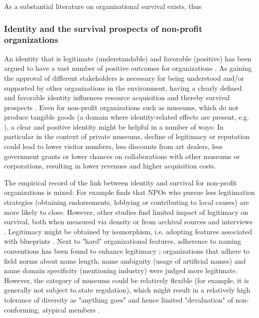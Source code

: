 \documentclass[12pt]{article}
\begin{document}
As a substantial literature on organizational survival exists, thus


\subsubsection*{Identity and the survival prospects of non-profit organizations}

An identity that is legitimate (understandable) and favorable (positive) has been argued to have a vast number of positive outcomes for organizations \parencite{Lange_Lee_Dai_2010_reputation}.
As gaining the approval of different stakeholders is necessary for being understood and/or supported by other organizations in the environment, having a clearly defined and favorable identity influences resource acquisition and thereby survival prospects \parencite{Rao_1994_reputation}.
Even for non-profit organizations such as museums, which do not produce tangible goods (a domain where identity-related effects are present, e.g. \cite{Hsu_2015_granted,Bogaert_etal_2014_ecological}), a clear and positive identity might be helpful in a number of ways:
In particular in the context of private museums, decline of legitimacy or reputation could lead to lower visitor numbers, less discounts from art dealers, less government grants or lower chances on collaborations with other museums or corporations, resulting in lower revenues and higher acquisition costs.


The empirical record of the link between identity and survival for non-profit organizations is mixed: 
For example \textcite{Bielefeld_1994_survival} finds that NPOs who pursue less legitimation strategies (obtaining endorsements, lobbying or contributing to local causes) are more likely to close.
However, other studies find limited impact of legitimacy on survival, both when measured via density \parencite{Bogaert_etal_2014_ecological} or from archival sources and interviews \parencite{Fernandez_2007_dissolution}.
Legitimacy might be obtained by isomorphism, i.e. adopting features associated with blueprints \parencite{diMaggio_1983_iron}.
Next to "hard" organizational features, adherence to naming conventions has been found to enhance legitimacy \parencite{Glynn_Abzug_2002_names}; organizations that adhere to field norms about name length, name ambiguity (usage of artificial names) and name domain specificity (mentioning industry) were judged more legitimate. 
However, the category of museums could be relatively flexible (for example, it is generally not subject to state regulation), which might result in a relatively high tolerance of diversity as "anything goes" and hence limited "devaluation" of non-conforming, atypical members \parencite{Bogaert_etal_2014_ecological}.
\end{document}
